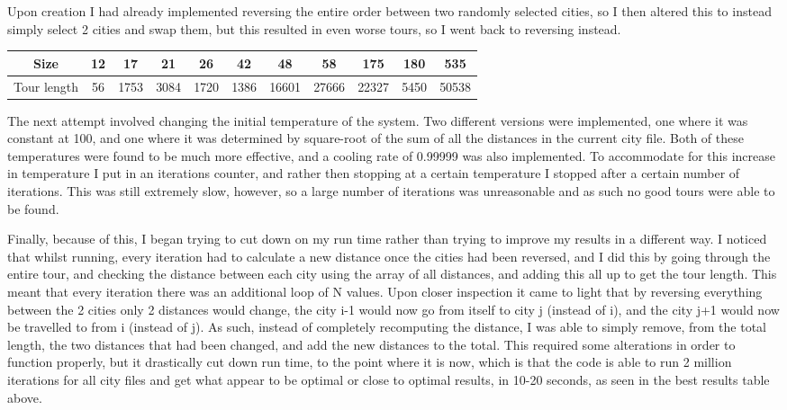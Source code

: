 \documentclass[11pt]{article}
\begin{document}
			\par
			Upon creation I had already implemented reversing the entire order between two randomly selected cities, so I then altered this to instead simply select 2 cities and swap them, but this resulted in even worse tours, so I went back to reversing instead.
			\begin{center}
				\begin{tabular}{| c | c | c | c | c | c | c | c | c | c | c |}
					\hline
					Size & 12 & 17 & 21 & 26 & 42 & 48 & 58 & 175 & 180 & 535 \\
					\hline
					Tour length & 56 & 1753 & 3084 & 1720 & 1386 & 16601 & 27666 & 22327 & 5450 & 50538 \\
					\hline
				\end{tabular}
			\end{center}
			\par
			The next attempt involved changing the initial temperature of the system. Two different versions were implemented, one where it was constant at 100, and one where it was determined by square-root of the sum of all the distances in the current city file. Both of these temperatures were found to be much more effective, and a cooling rate of 0.99999 was also implemented. To accommodate for this increase in temperature I put in an iterations counter, and rather then stopping at a certain temperature I stopped after a certain number of iterations. This was still extremely slow, however, so a large number of iterations was unreasonable and as such no good tours were able to be found.
			\par
			Finally, because of this, I began trying to cut down on my run time rather than trying to improve my results in a different way. I noticed that whilst running, every iteration had to calculate a new distance once the cities had been reversed, and I did this by going through the entire tour, and checking the distance between each city using the array of all distances, and adding this all up to get the tour length. This meant that every iteration there was an additional loop of N values. Upon closer inspection it came to light that by reversing everything between the 2 cities only 2 distances would change, the city i-1 would now go from itself to city j (instead of i), and the city j+1 would now be travelled to from i (instead of j). As such, instead of completely recomputing the distance, I was able to simply remove, from the total length, the two distances that had been changed, and add the new distances to the total. This required some alterations in order to function properly, but it drastically cut down run time, to the point where it is now, which is that the code is able to run 2 million iterations for all city files and get what appear to be optimal or close to optimal results, in 10-20 seconds, as seen in the best results table above.
\end{document}

